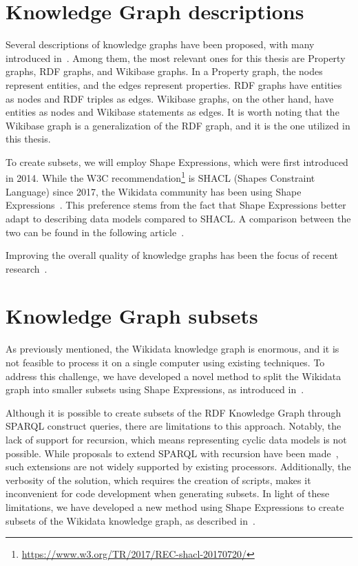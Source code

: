 \section{Knowledge Graph descriptions}

Several descriptions of knowledge graphs have been proposed, with many introduced in~\cite{https://doi.org/10.48550/arxiv.2110.11709}. Among them, the most relevant ones for this thesis are Property graphs, RDF graphs, and Wikibase graphs. In a Property graph, the nodes represent entities, and the edges represent properties. RDF graphs have entities as nodes and RDF triples as edges. Wikibase graphs, on the other hand, have entities as nodes and Wikibase statements as edges. It is worth noting that the Wikibase graph is a generalization of the RDF graph, and it is the one utilized in this thesis.

To create subsets, we will employ Shape Expressions, which were first introduced in 2014. While the W3C recommendation\footnote{\url{https://www.w3.org/TR/2017/REC-shacl-20170720/}} is SHACL (Shapes Constraint Language) since 2017, the Wikidata community has been using Shape Expressions~\cite{10.1007/978-3-030-21348-0_39}. This preference stems from the fact that Shape Expressions better adapt to describing data models compared to SHACL. A comparison between the two can be found in the following article~\cite{Labra2017}.

Improving the overall quality of knowledge graphs has been the focus of recent research~\cite{https://doi.org/10.48550/arxiv.2110.11709}.

\section{Knowledge Graph subsets}

As previously mentioned, the Wikidata knowledge graph is enormous, and it is not feasible to process it on a single computer using existing techniques. To address this challenge, we have developed a novel method to split the Wikidata graph into smaller subsets using Shape Expressions, as introduced in~\cite{https://doi.org/10.48550/arxiv.2110.11709}.

Although it is possible to create subsets of the RDF Knowledge Graph through SPARQL construct queries, there are limitations to this approach. Notably, the lack of support for recursion, which means representing cyclic data models is not possible. While proposals to extend SPARQL with recursion have been made~\cite{10.1007/978-3-319-25007-6_2}, such extensions are not widely supported by existing processors. Additionally, the verbosity of the solution, which requires the creation of scripts, makes it inconvenient for code development when generating subsets. In light of these limitations, we have developed a new method using Shape Expressions to create subsets of the Wikidata knowledge graph, as described in~\cite{https://doi.org/10.48550/arxiv.2110.11709}.

